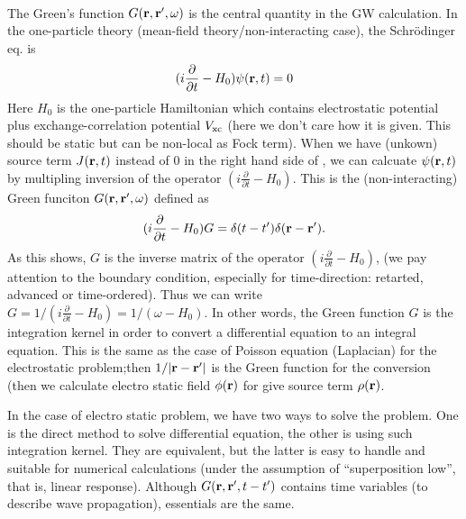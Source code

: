  \\%
The Green's function $G({\bf r},{\bf r}',\omega)$ is the central quantity in
the GW calculation. 
In the one-particle theory (mean-field theory/non-interacting
case), the Schr\"odinger eq. is
\begin{eqnarray}
(i \frac{\partial }{\partial t} - H_0) \psi({\bf r},t)=0 \label{sch0}
\end{eqnarray}
Here $H_0$ is the 
one-particle Hamiltonian which contains electrostatic potential
plus exchange-correlation potential $V_{\rm xc}$
(here we don't care how it is given. This should be static but can be
non-local as Fock term).
When we have (unkown) source term $J({\bf r},t)$ instead of 0
in the right hand side of ,
we can calcuate $\psi({\bf r},t)$ by multipling inversion of
the operator $(i \frac{\partial }{\partial t} - H_0)$.
This is the (non-interacting) Green funciton $G({\bf r},{\bf r}',\omega)$ defined as
\begin{eqnarray}
(i \frac{\partial }{\partial t} - H_0) G
= \delta(t-t')\delta({\bf r}-{\bf r}'). \label{g0def}
\end{eqnarray}
As this shows, $G$ is the inverse matrix of 
the operator $(i \frac{\partial }{\partial t} - H_0)$,
(we pay attention to the boundary condition, 
especially for time-direction: retarted, advanced or
time-ordered). Thus we can write 
$G=1/(i \frac{\partial }{\partial t} -H_0)=1/(\omega -H_0)$.
In other words, the Green function $G$ is the integration kernel
in order to convert a differential equation  to an integral
equation. This is the same as the case of Poisson equation
(Laplacian) for the electrostatic problem;then $1/|{\bf r}-{\bf r}'|$
is the Green function for the conversion (then we calculate electro
static field $\phi({\bf r})$ for give source term $\rho({\bf r})$.
 
In the case of electro static problem, we have two ways to solve the
problem. One is the direct method to solve differential equation,
the other is using such integration kernel. They are equivalent, but the
latter is easy to handle and suitable for numerical calculations
(under the assumption of ``superposition low'', that is, linear response).
Although $G({\bf r},{\bf r}', t-t')$ contains time variables (to describe wave
propagation), essentials are the same.\\


